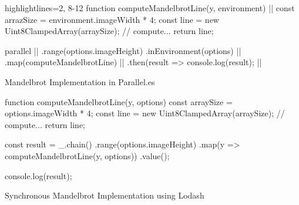 \begin{listing}
	\begin{javascriptcode*}{highlightlines={2, 8-12}}
function computeMandelbrotLine(y, environment) { |$\label{code:parallel-es-operation}$|
	const arrazSize = environment.imageWidth * 4;
	const line = new Uint8ClampedArray(arraySize);
	// compute...
	return line;
}

parallel      |$\label{code:parallel-es-definition-start}$|
	.range(options.imageHeight)
	.inEnvironment(options) |$\label{code:parallel-es-in-environment}$|
	.map(computeMandelbrotLine) |$\label{code:parallel-es-map}$|
	.then(result => console.log(result); |$\label{code:parallel-es-start}$|
	\end{javascriptcode*}
	
	\caption{Mandelbrot Implementation in Parallel.es}
	\label{code:mandelbrot-parallel.es}
\end{listing}


\begin{listing}
	
	\begin{javascriptcode}
function computeMandelbrotLine(y, options) {
	const arraySize = options.imageWidth * 4;
	const line = new Uint8ClampedArray(arraySize);
	// compute...
	return line;
}

const result = _.chain()
	.range(options.imageHeight)
	.map(y => computeMandelbrotLine(y, options))
	.value();
	
console.log(result);
\end{javascriptcode}
\caption{Synchronous Mandelbrot Implementation using Lodash~\cite{lodash}}
\label{fig:mandelbrot-sync}
\end{listing}